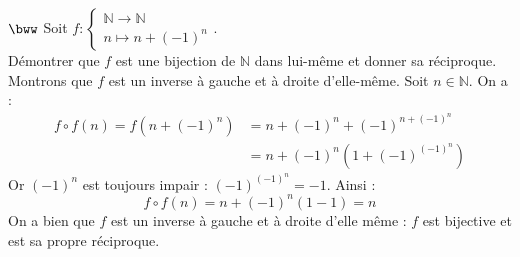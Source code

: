 \documentclass[11pt]{article}
\begin{document}
\begin{exercice}{$\bww$}{}
    Soit $f:\begin{cases}\mathbb{N} \to \mathbb{N} \\ n \mapsto n + (-1)^n\end{cases}$.\\
    Démontrer que $f$ est une bijection de $\mathbb{N}$ dans lui-même et donner sa réciproque.
    \tcblower
    Montrons que $f$ est un inverse à gauche et à droite d'elle-même. Soit $n\in\mathbb{N}$. On a :
    \begin{align*}
        f \circ f (n) = f(n + (-1)^n) &= n + (-1)^n + (-1)^{n + (-1)^n} \\&= n + (-1)^n(1+(-1)^{(-1)^n})
    \end{align*}
    Or $(-1)^n$ est toujours impair : $(-1)^{(-1)^n} = -1$. Ainsi :
    \begin{equation*}
        f\circ f(n) = n + (-1)^n(1-1) = n
    \end{equation*}
    On a bien que $f$ est un inverse à gauche et à droite d'elle même : $f$ est bijective et est sa propre réciproque.
\end{exercice}

\pagebreak
\end{document}
